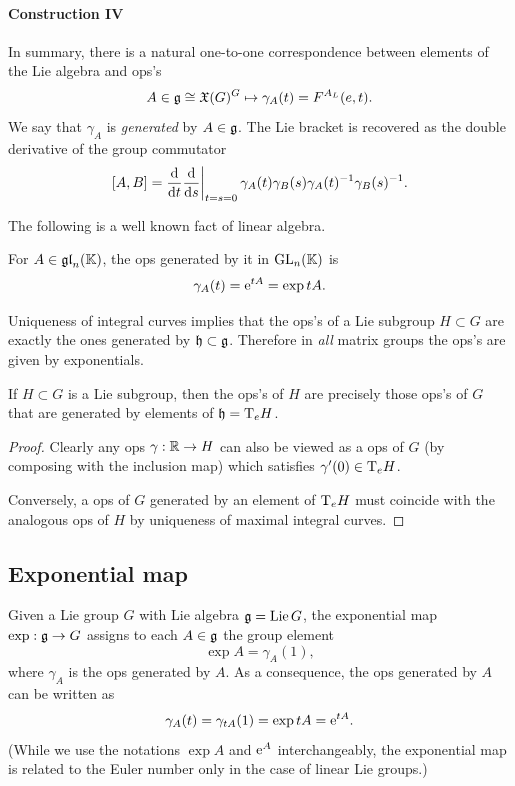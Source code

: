 \paragraph{Construction IV} In summary, there is a natural one-to-one correspondence between elements of the Lie algebra and \gls{ops}'s
\[A\in \mathfrak{g}\cong \mathfrak{X}(G)^G\mapsto \gamma_A(t)=F^{A_L}(e,t).\]
We say that $\gamma_A$ is \emph{generated} by $A\in\mathfrak{g}$. The Lie bracket is recovered as the double derivative of the group commutator
\[[A,B]=\restr{\frac{\dd}{\dd t}\frac{\dd}{\dd s}}{t=s=0}\gamma_A(t)\gamma_B(s)\gamma_A(t)^{-1}\gamma_B(s)^{-1}.\]

The following is a well known fact of linear algebra.

\begin{prop}
    For $A\in \mathfrak{gl}_n(\mathbb{K})$, the \gls{ops} generated by it in $\operatorname{GL}_n(\mathbb{K})$ is
    \[\gamma_A(t)=\mathrm{e}^{tA}=\exp tA.\]
\end{prop}
\begin{cor}
    Uniqueness of integral curves implies that the \gls{ops}'s of a Lie subgroup $H\subset G$ are exactly the ones generated by $\mathfrak{h} \subset \mathfrak{g}$. Therefore in \emph{all} matrix groups the \gls{ops}'s are given by exponentials.
\end{cor}

\begin{prop}\label{prop 20.3 Lee}
    If $H\subset G$ is a Lie subgroup, then the \gls{ops}'s of $H$ are precisely those \gls{ops}'s of $G$ that are generated by elements of $\mathfrak{h}=\mathrm{T}_e H$.
\end{prop}
\begin{proof}
    Clearly any \gls{ops} $\gamma:\mathbb{R}\to H$ can also be viewed as a \gls{ops} of $G$ (by composing with the inclusion map) which satisfies $\gamma'(0)\in \mathrm{T}_e H$.

    Conversely, a \gls{ops} of $G$ generated by an element of $\mathrm{T}_e H$ must coincide with the analogous \gls{ops} of $H$ by uniqueness of maximal integral curves.
\end{proof}







\subsection{Exponential map}


\begin{defn}
    Given a Lie group $G$ with Lie algebra $\mathfrak{g}=\operatorname{Lie} G$, the exponential map $\exp:\mathfrak{g}\to G$ assigns to each $A\in \mathfrak{g}$ the group element
    \[\exp A=\gamma_A(1),\]
    where $\gamma_A$ is the \gls{ops} generated by $A$. As a consequence, the \gls{ops} generated by $A$ can be written as \[\gamma_A(t)=\gamma_{tA}(1)=\exp tA=\mathrm{e}^{tA}.\]
    (While we use the notations $\exp A$ and $\mathrm{e}^A$ interchangeably, the exponential map is related to the Euler number only in the case of linear Lie groups.)
\end{defn}

